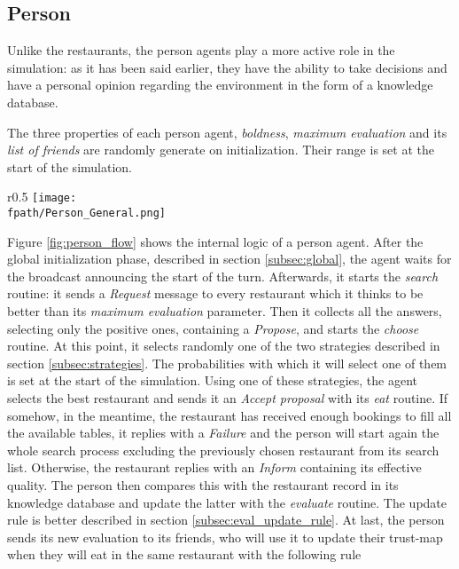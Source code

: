 \documentclass[10pt,a4paper,usenatbib]{article}
\newcommand{\fpath}{./Figs/}
\begin{document}
\pagebreak

\subsection{Person}
\label{subsec:person}
Unlike the restaurants, the person agents play a more active role in the simulation: as it has been said earlier, they have the ability to take decisions and have a personal opinion regarding the environment in the form of a knowledge database.

The three properties of each person agent, \textit{boldness}, \textit{maximum evaluation} and its \textit{list of friends} are randomly generate on initialization. Their range is set at the start of the simulation.

\begin{wrapfigure}{r}{0.5\textwidth}
\centering
\texttt{[image: \\fpath/Person\_General.png]}
\caption{\small \textit{Diagram of the internal logic of the Person class}}
\label{fig:person_flow}
\end{wrapfigure}

Figure \ref{fig:person_flow} shows the internal logic of a person agent. After the global initialization phase, described in section \ref{subsec:global}, the agent waits for the broadcast announcing the start of the turn. Afterwards, it starts the \textit{search} routine: it sends a \textit{Request} message to every restaurant which it thinks to be better than its \textit{maximum evaluation} parameter. Then it collects all the answers, selecting only the positive ones, containing a \textit{Propose}, and starts the \textit{choose} routine. At this point, it selects randomly one of the two strategies described in section \ref{subsec:strategies}. The probabilities with which it will select one of them is set at the start of the simulation. Using one of these strategies, the agent selects the best restaurant and sends it an \textit{Accept proposal} with its \textit{eat} routine. If somehow, in the meantime, the restaurant has received enough bookings to fill all the available tables, it replies with a \textit{Failure} and the person will start again the whole search process excluding the previously chosen restaurant from its search list. Otherwise, the restaurant replies with an \textit{Inform} containing its effective quality. The person then compares this with the restaurant record in its knowledge database and update the latter with the \textit{evaluate} routine. The update rule is better described in section \ref{subsec:eval_update_rule}. At last, the person sends its new evaluation to its friends, who will use it to update their trust-map when they will eat in the same restaurant with the following rule
\end{document}
